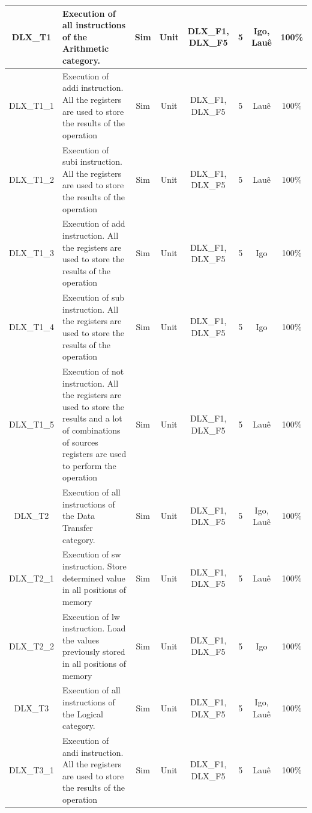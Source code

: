 \documentclass{article}
\begin{document}
\begin{landscape}
\begin{center}
\begin{longtable}[pos]{| c | m{5cm} | c | c | c | c | c | c |}
        \hline
        \endlastfoot
      	DLX\_T1      & Execution of all instructions of the Arithmetic category.  &	Sim & Unit & DLX\_F1, DLX\_F5 & 5 & Igo, Lauê & 100\% \\ \hline   
        DLX\_T1\_1    & Execution of addi instruction. All the registers are used to store the results of the operation   &	Sim & Unit & DLX\_F1, DLX\_F5 & 5 & Lauê & 100\% \\ \hline	
        DLX\_T1\_2    & Execution of subi instruction. All the registers are used to store the results of the operation   &	Sim & Unit & DLX\_F1, DLX\_F5 & 5 & Lauê & 100\% \\ \hline	
        DLX\_T1\_3    & Execution of add instruction. All the registers are used to store the results of the operation   &	Sim & Unit & DLX\_F1, DLX\_F5 & 5 & Igo & 100\% \\ \hline	
        DLX\_T1\_4    & Execution of sub instruction. All the registers are used to store the results of the operation   &	Sim & Unit & DLX\_F1, DLX\_F5 & 5 & Igo & 100\% \\ \hline	
        DLX\_T1\_5    & Execution of not instruction. All the registers are used to store the results and a lot of combinations of sources registers are used to perform the operation   &	Sim & Unit & DLX\_F1, DLX\_F5 & 5 & Lauê & 100\% \\ \hline
      	DLX\_T2      & Execution of all instructions of the Data Transfer category.  &	Sim & Unit & DLX\_F1, DLX\_F5 & 5 & Igo, Lauê & 100\% \\ \hline   
        DLX\_T2\_1    & Execution of sw instruction. Store determined value in all positions of memory   &	Sim & Unit & DLX\_F1,  DLX\_F5 & 5 & Lauê & 100\% \\ \hline
        DLX\_T2\_2    & Execution of lw instruction. Load the values previously stored in all positions of memory   &	Sim & Unit & DLX\_F1, DLX\_F5 & 5 & Igo & 100\% \\ \hline
      	DLX\_T3      & Execution of all instructions of the Logical category.   &	Sim & Unit & DLX\_F1, DLX\_F5 & 5 & Igo, Lauê & 100\% \\ \hline  
        DLX\_T3\_1    & Execution of andi instruction. All the registers are used to store the results of the operation   &	Sim & Unit & DLX\_F1, DLX\_F5 & 5 & Lauê & 100\% \\ \hline	

\end{longtable}
\end{center}
\end{landscape}
\end{document}
